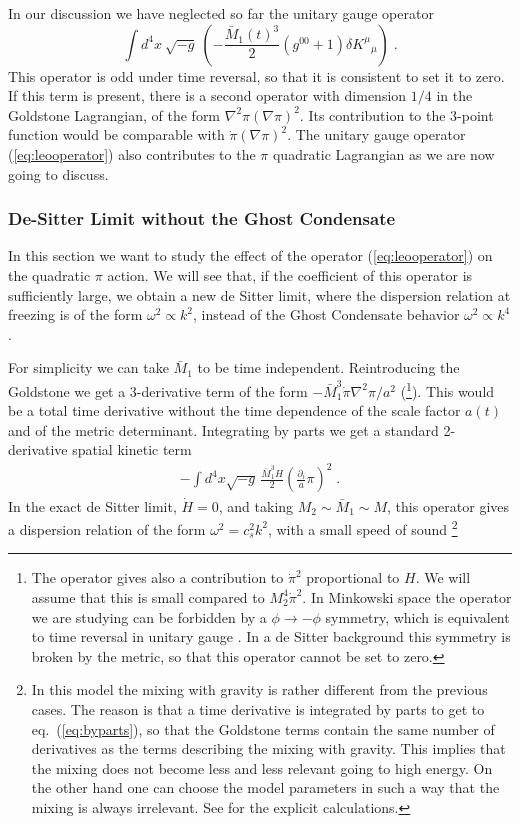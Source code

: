 \documentclass[12pt,letterpaper]{article}
\def\be{\begin{eqnarray}}
\def\ee{\end{eqnarray}}
\begin{document}
{In our discussion we have neglected so far the unitary gauge operator
\begin{equation}
\label{eq:leooperator}
\int \! d^4 x \: \sqrt{- g} \:
\left(-\frac{\bar M_1(t)^3}{2} (g^{00}+1)\delta K^\mu {}_\mu \right)\;.
\end{equation}
This operator is odd under time reversal, so that it is consistent to
set it to zero. If this term is present, there is a second
operator with dimension $1/4$ in the Goldstone Lagrangian, of the form $\nabla^2\pi (\nabla\pi)^2$.
Its contribution to the 3-point function would be comparable
with $\dot\pi(\nabla\pi)^2$. The unitary gauge operator
(\ref{eq:leooperator}) also
contributes to the $\pi$ quadratic Lagrangian as we are now going to
discuss.



\subsubsection{De-Sitter Limit without the Ghost Condensate}
In this section we want to study the effect of the operator (\ref{eq:leooperator}) on
the quadratic $\pi$ action. We will see that, if the coefficient of
this operator is sufficiently large, we obtain a new de Sitter limit,
where the dispersion relation at freezing is of the form $\omega^2
\propto k^2$, instead of the Ghost Condensate behavior $\omega^2
\propto k^4$.

For simplicity we can take $\bar M_1$ to be time
independent. Reintroducing the Goldstone we get a 3-derivative term of
the form $-\bar M_1^3 \dot\pi\nabla^2\pi/a^2$ (\footnote{The operator
  gives also a contribution to $\dot\pi^2$ proportional to $H$. We
  will assume that this is small compared to $M_2^4 \dot\pi^2$. In
  Minkowski space the
  operator we are studying can be forbidden by a $\phi \to -\phi$
  symmetry, which is equivalent to time reversal in unitary gauge \cite{Arkani-Hamed:2003uy}. In
  a de Sitter background this symmetry is broken by the metric, so
  that this operator cannot be set to zero.}). This would be a total
time derivative without the time dependence of the scale factor
$a(t)$ and of the metric determinant. Integrating by parts we get a standard 2-derivative spatial
kinetic term
\be
\label{eq:byparts}
-\int d^4 x \sqrt{-g} \,\frac{\bar M_1^3 H}{2}
\left(\frac{\partial_i}{a}\pi\right)^2 \;.
\ee
In the exact de Sitter limit, $\dot H =0$, and taking $M_2 \sim \bar
M_1 \sim M$, this operator gives a dispersion relation of the form
$\omega^2 = c_s^2 k^2$, with a small speed of sound \footnote{In this
  model the mixing with gravity is rather different from the
  previous cases. The reason is that a time derivative is integrated
  by parts to get to eq.~(\ref{eq:byparts}), so that the Goldstone
  terms contain the same number of derivatives as the terms
  describing the mixing with gravity. This implies that the mixing
  does not become less and less relevant going to high energy. On the
  other hand one can choose the model parameters in such a way that
  the mixing is always irrelevant. See \cite{Creminelli:2006rz} for
  the explicit calculations.}

}
\end{document}
